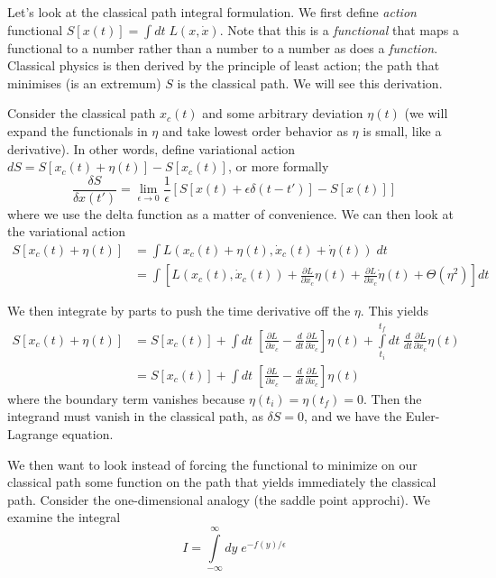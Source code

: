 \documentclass[10pt]{report}
\newcommand{\rd}[2]{\frac{d#1}{d#2}}
\newcommand{\pd}[2]{\frac{\partial #1}{\partial#2}}
\begin{document}
Let's look at the classical path integral formulation. We first define \emph{action} functional $S[x(t)] = \int dt\; L(x, \dot{x})$. Note that this is a \emph{functional} that maps a functional to a number rather than a number to a number as does a \emph{function}. Classical physics is then derived by the principle of least action; the path that minimises (is an extremum) $S$ is the classical path. We will see this derivation. 

Consider the classical path $x_c(t)$ and some arbitrary deviation $\eta(t)$ (we will expand the functionals in $\eta$ and take lowest order behavior as $\eta$ is small, like a derivative). In other words, define variational action $dS = S[x_c(t) + \eta(t)] - S[x_c(t)]$, or more formally
\begin{equation}
    \frac{\delta S}{\delta x(t')} = \lim_{\epsilon \to 0}\frac{1}{\epsilon}\left[ S[x(t) + \epsilon \delta(t-t')] - S[x(t)] \right]
\end{equation}
where we use the delta function as a matter of convenience. We can then look at the variational action
\begin{align}
    S[x_c(t) + \eta(t)] &= \int L(x_c(t) + \eta(t), \dot{x}_c(t) + \dot{\eta}(t))\; dt\\
    &= \int \left[ L(x_c(t), \dot{x}_c(t)) + \pd{L}{x_c}\eta(t) + \pd{L}{\dot{x}_c}\dot{\eta}(t) + \Theta(\eta^2) \right]dt
\end{align}

We then integrate by parts to push the time derivative off the $\eta$. This yields
\begin{align}
    S[x_c(t) + \eta(t)] &= S[x_c(t)] + \int dt\; \left[ \pd{L}{x_{c}} - \rd{}{t}\pd{L}{\dot{x}_c} \right]\eta(t) + \int\limits_{t_i}^{t_f}dt\;\rd{}{t}\pd{L}{\dot{x}_c}\eta(t)\\
    &= S[x_c(t)] + \int dt\; \left[ \pd{L}{x_{c}} - \rd{}{t}\pd{L}{\dot{x}_c} \right]\eta(t)
\end{align}
where the boundary term vanishes because $\eta(t_i) = \eta(t_f) = 0$. Then the integrand must vanish in the classical path, as $\delta S = 0$, and we have the Euler-Lagrange equation. 

We then want to look instead of forcing the functional to minimize on our classical path some function on the path that yields immediately the classical path. Consider the one-dimensional analogy (the saddle point approchi). We examine the integral
\begin{equation}
    I = \int\limits_{-\infty}^{\infty}dy\;e^{-f(y)/\epsilon}
\end{equation}
\end{document}
